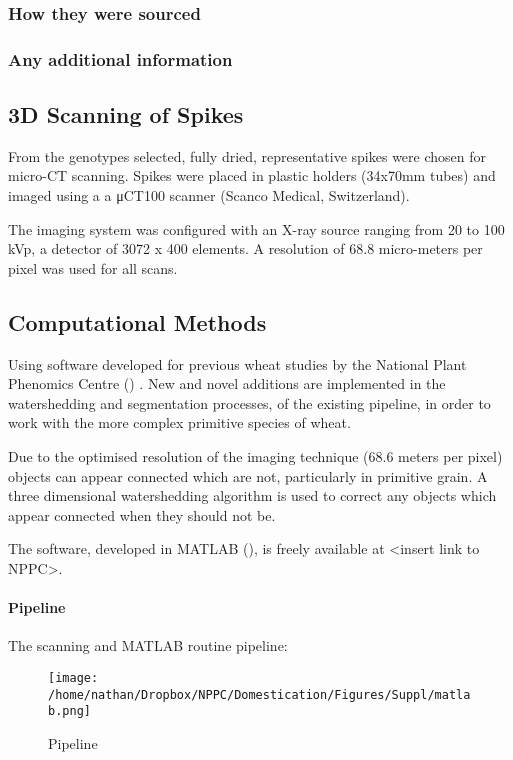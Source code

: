 \documentclass[a4paper, twocolumn]{article}
\begin{document}
\subsubsection{How they were sourced}
\label{sec:org081eb15}
\subsubsection{Any additional information}
\label{sec:org9aa63da}

\subsection{3D Scanning of Spikes}
\label{sec:orgbfaa441}

From the genotypes selected, fully dried,
representative spikes were chosen for micro-CT scanning.
Spikes were placed in plastic holders (34x70mm tubes) and imaged using a a μCT100 scanner (Scanco Medical, Switzerland).

The imaging system was configured with an X-ray source ranging from 20 to 100 kVp,
a detector of 3072 x 400 elements. A resolution of 68.8 micro-meters per pixel was used for all scans.


\subsection{Computational Methods}
\label{sec:org6e3c7eb}

Using software developed for previous wheat studies by the National Plant Phenomics Centre (\cite{Hughes2017}) . New and novel additions are implemented in the watershedding and segmentation processes, of the existing pipeline, in order to work with the more complex primitive species of wheat.

Due to the optimised resolution of the imaging technique (68.6\textmu{} meters per pixel) objects can appear connected which are not, particularly in primitive grain. A three dimensional watershedding algorithm is used to correct any objects which appear connected when they should not be.

The software, developed in MATLAB (\cite{MATHWORKS2017}), is freely available at <insert link to NPPC>.

\paragraph{Pipeline}
\label{sec:org846ffcf}
The scanning and MATLAB routine pipeline:

\begin{figure}[htbp]
\centering
\texttt{[image: /home/nathan/Dropbox/NPPC/Domestication/Figures/Suppl/matlab.png]}
\caption{\label{fig:org4071500}
Pipeline}
\end{figure}
\end{document}
